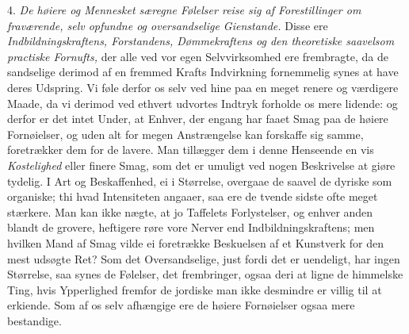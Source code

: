 \documentclass[12pt,a4paper]{article}
\newcommand{\opage}[1]{\marginnote{\footnotesize\textit{[#1]}}}
\begin{document}
4. \emph{De høiere og Mennesket særegne Følelser reise sig af Forestillinger om
fraværende, selv opfundne og oversandselige Gienstande.} Disse ere
\emph{Indbildningskraftens, Forstandens, Dømmekraftens og den theoretiske saavelsom
practiske Fornufts,} der alle ved vor egen Selvvirksomhed ere frembragte, da de sandselige
derimod af en fremmed Krafts Indvirkning fornemmelig synes at have deres Udspring. Vi føle
derfor os selv ved hine paa en meget renere og værdigere Maade, da vi derimod ved ethvert
udvortes Indtryk forholde os mere lidende: og derfor er det intet Under, at Enhver, der
engang har faaet Smag paa de høiere Fornøielser, og uden alt for megen Anstrængelse kan
forskaffe sig samme, foretrækker dem for de lavere. Man tillægger dem i denne Henseende en
vis \emph{Kostelighed} eller finere Smag, som det er umuligt ved nogen Beskrivelse at giøre
tydelig. I Art og Beskaffenhed, ei i Størrelse, overgaae de saavel de dyriske som
organiske; thi hvad Intensiteten angaaer, saa ere de tvende sidste ofte meget stærkere.
Man kan ikke nægte, at jo Taffelets Forlystelser, og enhver anden blandt de grovere,
heftigere røre vore
\opage{236} Nerver end Indbildningskraftens; men hvilken Mand af Smag vilde ei foretrække Beskuelsen af
et Kunstverk for den mest udsøgte Ret? Som det Oversandselige, just fordi det er uendeligt,
har ingen Størrelse, saa synes de Følelser, det frembringer, ogsaa deri at ligne de
himmelske Ting, hvis Ypperlighed fremfor de jordiske man ikke desmindre er villig til at
erkiende. Som af os selv afhængige ere de høiere Fornøielser ogsaa mere bestandige.
\end{document}
